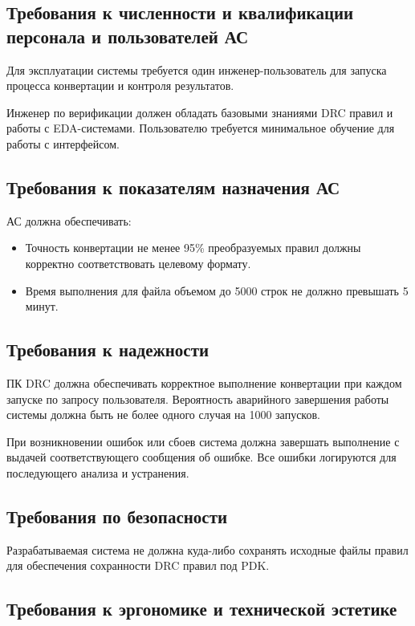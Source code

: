 \subsection{Требования к численности
	и квалификации персонала и пользователей АС}

Для эксплуатации системы требуется один инженер-пользователь
для запуска процесса конвертации и контроля результатов.

Инженер по верификации должен обладать базовыми знаниями DRC правил
и работы с EDA-системами.
Пользователю требуется минимальное обучение для работы с интерфейсом.

\subsection{Требования к показателям назначения АС}

АС должна обеспечивать:

\begin{itemize}
	\item Точность конвертации не менее 95\%
		преобразуемых правил должны корректно
		соответствовать целевому формату.
	\item Время выполнения для файла объемом
		до 5000 строк не должно превышать 5 минут.
\end{itemize}

\subsection{Требования к надежности}

ПК DRC должна обеспечивать корректное выполнение конвертации
при каждом запуске по запросу пользователя.
Вероятность аварийного завершения работы системы должна быть
не более одного случая на 1000 запусков.

При возникновении ошибок или сбоев система должна завершать выполнение
с выдачей соответствующего сообщения об ошибке.
Все ошибки логируются для последующего анализа и устранения.

\subsection{Требования по безопасности}

Разрабатываемая система не должна куда-либо сохранять исходные файлы правил
для обеспечения сохранности DRC правил под PDK.

\subsection{Требования к эргономике и технической эстетике}

